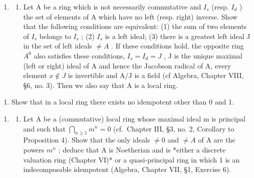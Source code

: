 
\begin{enumerate}
\def\labelenumi{\arabic{enumi}.}
\tightlist
\item
  \begin{enumerate}
  \def\labelenumii{(\alph{enumii})}
  \tightlist
  \item
    Let A be a ring which is not necessarily commutative and \(I_{s}\) (resp. \(I_{d}\) ) the set of elements of A which have no left (resp. right) inverse. Show that the following conditions are equivalent: (1) the sum of two elements of \(I_{s}\) belongs to \(I_{s}\) ; (2) \(I_{s}\) is a left ideal; (3) there is a greatest left ideal J in the set of left ideals \(\neq A\) . If these conditions hold, the opposite ring \(A^{0}\) also satisfies these conditions, \(I_{s} = I_{d} = J\) , J is the unique maximal (left or right) ideal of A and hence the Jacobson radical of A, every element \(x \notin J\) is invertible and A/J is a field (cf Algebra, Chapter VIII, §6, no. 3). Then we also say that A is a local ring.
  \end{enumerate}
\end{enumerate}

\begin{enumerate}
\def\labelenumi{(\alph{enumi})}
\setcounter{enumi}{1}
\tightlist
\item
  Show that in a local ring there exists no idempotent other than 0 and 1.
\end{enumerate}

\begin{enumerate}
\def\labelenumi{\arabic{enumi}.}
\setcounter{enumi}{1}
\tightlist
\item
  \begin{enumerate}
  \def\labelenumii{(\alph{enumii})}
  \tightlist
  \item
    Let A be a (commutative) local ring whose maximal ideal m is principal and such that \(\bigcap_{n\geqslant1}m^{n}=0\) (cf.~Chapter III, §3, no. 2, Corollary to Proposition 4). Show that the only ideals \(\neq0\) and \(\neq A\) of A are the powers \(m^{n}\) ; deduce that A is Noetherian and is *either a discrete valuation ring (Chapter VI)* or a quasi-principal ring in which 1 is an indecomposable idempotent (Algebra, Chapter VII, §1, Exercise 6).
  \end{enumerate}
\end{enumerate}

